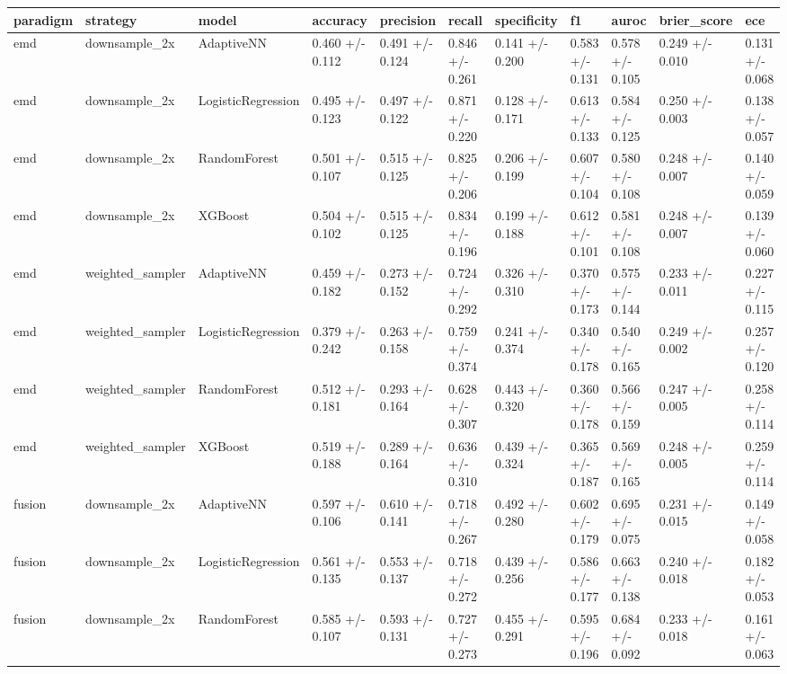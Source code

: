 \begin{tabular}{lllllllllll}
\toprule
paradigm & strategy & model & accuracy & precision & recall & specificity & f1 & auroc & brier_score & ece \\
\midrule
emd & downsample_2x & AdaptiveNN & 0.460 +/- 0.112 & 0.491 +/- 0.124 & 0.846 +/- 0.261 & 0.141 +/- 0.200 & 0.583 +/- 0.131 & 0.578 +/- 0.105 & 0.249 +/- 0.010 & 0.131 +/- 0.068 \\
emd & downsample_2x & LogisticRegression & 0.495 +/- 0.123 & 0.497 +/- 0.122 & 0.871 +/- 0.220 & 0.128 +/- 0.171 & 0.613 +/- 0.133 & 0.584 +/- 0.125 & 0.250 +/- 0.003 & 0.138 +/- 0.057 \\
emd & downsample_2x & RandomForest & 0.501 +/- 0.107 & 0.515 +/- 0.125 & 0.825 +/- 0.206 & 0.206 +/- 0.199 & 0.607 +/- 0.104 & 0.580 +/- 0.108 & 0.248 +/- 0.007 & 0.140 +/- 0.059 \\
emd & downsample_2x & XGBoost & 0.504 +/- 0.102 & 0.515 +/- 0.125 & 0.834 +/- 0.196 & 0.199 +/- 0.188 & 0.612 +/- 0.101 & 0.581 +/- 0.108 & 0.248 +/- 0.007 & 0.139 +/- 0.060 \\
emd & weighted_sampler & AdaptiveNN & 0.459 +/- 0.182 & 0.273 +/- 0.152 & 0.724 +/- 0.292 & 0.326 +/- 0.310 & 0.370 +/- 0.173 & 0.575 +/- 0.144 & 0.233 +/- 0.011 & 0.227 +/- 0.115 \\
emd & weighted_sampler & LogisticRegression & 0.379 +/- 0.242 & 0.263 +/- 0.158 & 0.759 +/- 0.374 & 0.241 +/- 0.374 & 0.340 +/- 0.178 & 0.540 +/- 0.165 & 0.249 +/- 0.002 & 0.257 +/- 0.120 \\
emd & weighted_sampler & RandomForest & 0.512 +/- 0.181 & 0.293 +/- 0.164 & 0.628 +/- 0.307 & 0.443 +/- 0.320 & 0.360 +/- 0.178 & 0.566 +/- 0.159 & 0.247 +/- 0.005 & 0.258 +/- 0.114 \\
emd & weighted_sampler & XGBoost & 0.519 +/- 0.188 & 0.289 +/- 0.164 & 0.636 +/- 0.310 & 0.439 +/- 0.324 & 0.365 +/- 0.187 & 0.569 +/- 0.165 & 0.248 +/- 0.005 & 0.259 +/- 0.114 \\
fusion & downsample_2x & AdaptiveNN & 0.597 +/- 0.106 & 0.610 +/- 0.141 & 0.718 +/- 0.267 & 0.492 +/- 0.280 & 0.602 +/- 0.179 & 0.695 +/- 0.075 & 0.231 +/- 0.015 & 0.149 +/- 0.058 \\
fusion & downsample_2x & LogisticRegression & 0.561 +/- 0.135 & 0.553 +/- 0.137 & 0.718 +/- 0.272 & 0.439 +/- 0.256 & 0.586 +/- 0.177 & 0.663 +/- 0.138 & 0.240 +/- 0.018 & 0.182 +/- 0.053 \\
fusion & downsample_2x & RandomForest & 0.585 +/- 0.107 & 0.593 +/- 0.131 & 0.727 +/- 0.273 & 0.455 +/- 0.291 & 0.595 +/- 0.196 & 0.684 +/- 0.092 & 0.233 +/- 0.018 & 0.161 +/- 0.063 \\

\end{tabular}
